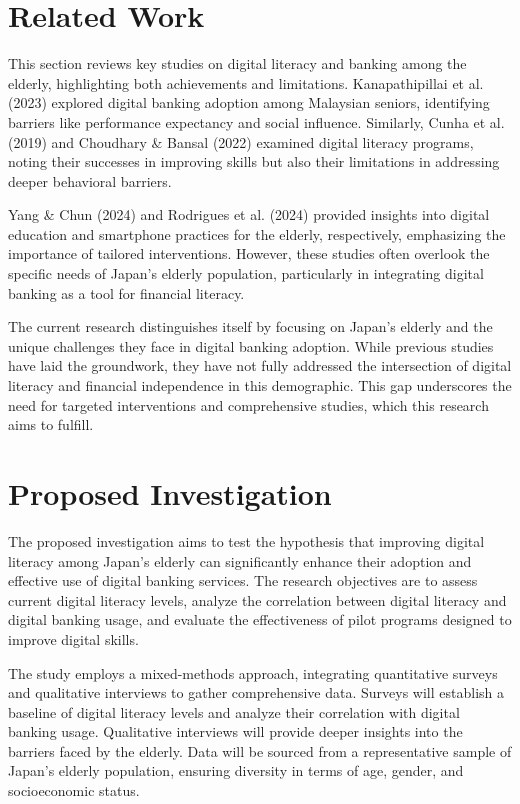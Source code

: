 \documentclass{article} %
\begin{document}
\section{Related Work}
\label{sec:related}
This section reviews key studies on digital literacy and banking among the elderly, highlighting both achievements and limitations. Kanapathipillai et al. (2023) explored digital banking adoption among Malaysian seniors, identifying barriers like performance expectancy and social influence. Similarly, Cunha et al. (2019) and Choudhary & Bansal (2022) examined digital literacy programs, noting their successes in improving skills but also their limitations in addressing deeper behavioral barriers.

Yang & Chun (2024) and Rodrigues et al. (2024) provided insights into digital education and smartphone practices for the elderly, respectively, emphasizing the importance of tailored interventions. However, these studies often overlook the specific needs of Japan's elderly population, particularly in integrating digital banking as a tool for financial literacy.

The current research distinguishes itself by focusing on Japan's elderly and the unique challenges they face in digital banking adoption. While previous studies have laid the groundwork, they have not fully addressed the intersection of digital literacy and financial independence in this demographic. This gap underscores the need for targeted interventions and comprehensive studies, which this research aims to fulfill.

\section{Proposed Investigation}
\label{sec:investigation}
The proposed investigation aims to test the hypothesis that improving digital literacy among Japan's elderly can significantly enhance their adoption and effective use of digital banking services. The research objectives are to assess current digital literacy levels, analyze the correlation between digital literacy and digital banking usage, and evaluate the effectiveness of pilot programs designed to improve digital skills.

The study employs a mixed-methods approach, integrating quantitative surveys and qualitative interviews to gather comprehensive data. Surveys will establish a baseline of digital literacy levels and analyze their correlation with digital banking usage. Qualitative interviews will provide deeper insights into the barriers faced by the elderly. Data will be sourced from a representative sample of Japan's elderly population, ensuring diversity in terms of age, gender, and socioeconomic status.
\end{document}
